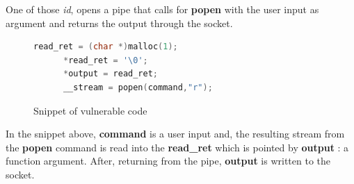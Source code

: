 \documentclass{article}
\begin{document}
One of those \textit{id}, opens a pipe that calls for \textbf{popen} with the user input as argument and returns the output through the socket.
\begin{figure}[!ht]
	\begin{lstlisting}[language=c]
	  read_ret = (char *)malloc(1);
	  *read_ret = '\0';
	  *output = read_ret;
	  __stream = popen(command,"r");	
	\end{lstlisting}
	\caption{Snippet of vulnerable code}	
\end{figure}
In the snippet above, \textbf{command} is a user input and, the resulting stream from the \textbf{popen} command is read into the \textbf{read\_ret} which is pointed by \textbf{output} : a function argument. After, returning from the pipe, \textbf{output} is written to the socket.
\end{document}
